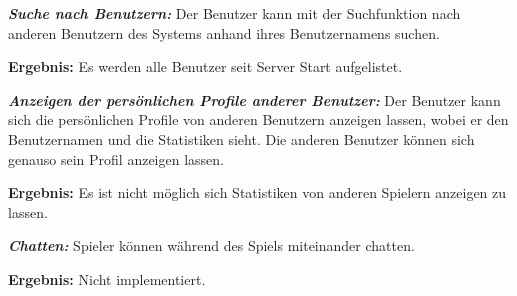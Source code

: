 \documentclass[parskip=full]{scrartcl}
\begin{document}
\begin{description}
	\item[F1050] \textbf{\textit{Suche nach Benutzern: }} Der Benutzer kann mit der Suchfunktion nach anderen Benutzern des Systems anhand ihres Benutzernamens suchen.
	\item \textbf{Ergebnis: } Es werden alle Benutzer seit Server Start aufgelistet.
	
	\item[F1060]  \textbf{\textit{Anzeigen der persönlichen Profile anderer Benutzer: }}
	Der Benutzer kann sich die persönlichen Profile von anderen Benutzern anzeigen lassen, wobei er den Benutzernamen und die Statistiken sieht. Die anderen Benutzer können sich genauso sein Profil anzeigen lassen.
	\item \textbf{Ergebnis: } Es ist nicht möglich sich Statistiken von anderen Spielern anzeigen zu lassen.
	
	\item[F1070] \textbf{\textit{Chatten: }} Spieler können während des Spiels miteinander chatten.	
	\item \textbf{Ergebnis: } Nicht implementiert.
	
\end{description}
\end{document}
